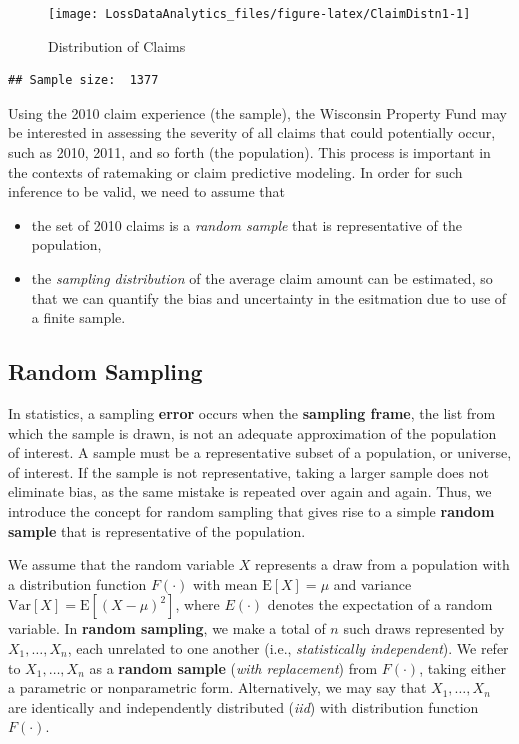 \documentclass[]{book}
\providecommand{\tightlist}{%
  \setlength{\itemsep}{0pt}\setlength{\parskip}{0pt}}
\theoremstyle{definition}
\theoremstyle{definition}
\theoremstyle{definition}
\theoremstyle{remark}
\begin{document}
\begin{figure}

{\centering \texttt{[image: LossDataAnalytics\_files/figure-latex/ClaimDistn1-1]} 

}

\caption{Distribution of Claims}\label{fig:ClaimDistn1}
\end{figure}

\begin{verbatim}
## Sample size:  1377
\end{verbatim}

Using the 2010 claim experience (the sample), the Wisconsin Property
Fund may be interested in assessing the severity of all claims that
could potentially occur, such as 2010, 2011, and so forth (the
population). This process is important in the contexts of ratemaking or
claim predictive modeling. In order for such inference to be valid, we
need to assume that

\begin{itemize}
\tightlist
\item
  the set of 2010 claims is a \emph{random sample} that is
  representative of the population,
\item
  the \emph{sampling distribution} of the average claim amount can be
  estimated, so that we can quantify the bias and uncertainty in the
  esitmation due to use of a finite sample.
\end{itemize}

\subsection{Random Sampling}\label{random-sampling}

In statistics, a sampling \textbf{error} occurs when the
\textbf{sampling frame}, the list from which the sample is drawn, is not
an adequate approximation of the population of interest. A sample must
be a representative subset of a population, or universe, of interest. If
the sample is not representative, taking a larger sample does not
eliminate bias, as the same mistake is repeated over again and again.
Thus, we introduce the concept for random sampling that gives rise to a
simple \textbf{random sample} that is representative of the population.

We assume that the random variable \(X\) represents a draw from a
population with a distribution function \(F(\cdot)\) with mean
\(\mathrm{E}[X]=\mu\) and variance
\(\mathrm{Var}[X]=\mathrm{E}[(X-\mu)^2]\), where \(E(\cdot)\) denotes
the expectation of a random variable. In \textbf{random sampling}, we
make a total of \(n\) such draws represented by \(X_1, \ldots, X_n\),
each unrelated to one another (i.e., \emph{statistically independent}).
We refer to \(X_1, \ldots, X_n\) as a \textbf{random sample} (\emph{with
replacement}) from \(F(\cdot)\), taking either a parametric or
nonparametric form. Alternatively, we may say that \(X_1, \ldots, X_n\)
are identically and independently distributed (\emph{iid}) with
distribution function \(F(\cdot)\).
\end{document}
